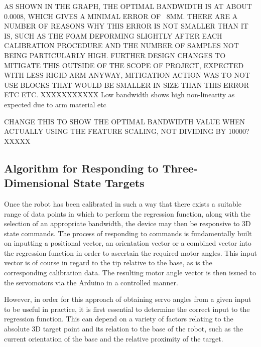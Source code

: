 \documentclass[11pt]{article}
\begin{document}
AS SHOWN IN THE GRAPH, THE OPTIMAL BANDWIDTH IS AT ABOUT 0.0008, WHICH GIVES A MINIMAL ERROR OF ~8MM. THERE ARE A NUMBER OF REASONS WHY THIS ERROR IS NOT SMALLER THAN IT IS, SUCH AS THE FOAM DEFORMING SLIGHTLY AFTER EACH CALIBRATION PROCEDURE AND THE NUMBER OF SAMPLES NOT BEING PARTICULARLY HIGH. FURTHER DESIGN CHANGES TO MITIGATE THIS OUTSIDE OF THE SCOPE OF PROJECT, EXPECTED WITH LESS RIGID ARM ANYWAY, MITIGATION ACTION WAS TO NOT USE BLOCKS THAT WOULD BE SMALLER IN SIZE THAN THIS ERROR ETC ETC. XXXXXXXXXXX
Low bandwidth shows high non-linearity as expected due to arm material etc


CHANGE THIS TO SHOW THE OPTIMAL BANDWIDTH VALUE WHEN ACTUALLY USING THE FEATURE SCALING, NOT DIVIDING BY 10000? XXXXX

\pagebreak 
\subsection{Algorithm for Responding to Three-Dimensional State Targets}
Once the robot has been calibrated in such a way that there exists a suitable range of data points in which to perform the regression function, along with the selection of an appropriate bandwidth, the device may then be responsive to 3D state commands.
The process of responding to commands is fundamentally built on inputting a positional vector, an orientation vector or a combined vector into the regression function in order to ascertain the required motor angles. This input vector is of course in regard to the tip relative to the base, as is the corresponding calibration data. The resulting motor angle vector is then issued to the servomotors via the Arduino in a controlled manner. 

However, in order for this approach of obtaining servo angles from a given input to be useful in practice, it is first essential to determine the correct input to the regression function. This can depend on a variety of factors relating to the absolute 3D target point and its relation to the base of the robot, such as the current orientation of the base and the relative proximity of the target.
\end{document}

